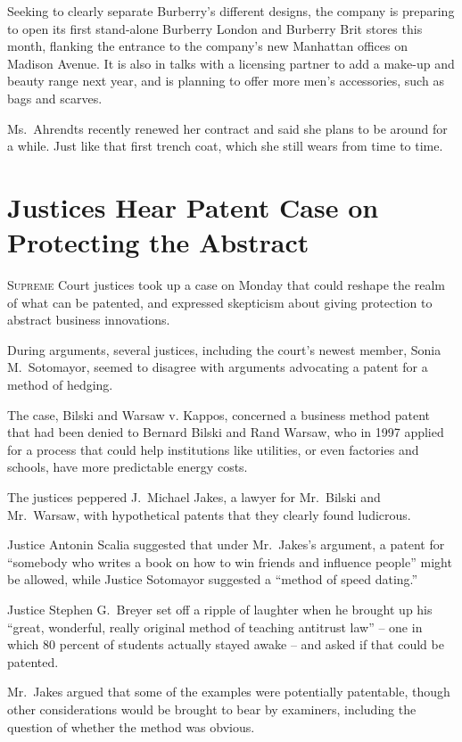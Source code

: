 ﻿\documentclass[12pt]{article}
\begin{document}
Seeking to clearly separate Burberry's different designs, the company is preparing to open its first
stand-alone Burberry London and Burberry Brit stores this month, flanking the entrance to the
company's new Manhattan offices on Madison Avenue. It is also in talks with a licensing partner to
add a make-up and beauty range next year, and is planning to offer more men's accessories, such as
bags and scarves.

Ms.~Ahrendts recently renewed her contract and said she plans to be around for a while. Just like
that first trench coat, which she still wears from time to time.

\section{Justices Hear Patent Case on Protecting the Abstract}

\lettrine{S}{upreme} Court justices took up a case on Monday that could
reshape the realm of what can be patented, and expressed skepticism about giving protection to
abstract business innovations.

During arguments, several justices, including the court's newest member, Sonia M.~Sotomayor, seemed
to disagree with arguments advocating a patent for a method of hedging.

The case, Bilski and Warsaw v. Kappos, concerned a business method patent that had been denied to
Bernard Bilski and Rand Warsaw, who in 1997 applied for a process that could help institutions like
utilities, or even factories and schools, have more predictable energy costs.

The justices peppered J.~Michael Jakes, a lawyer for Mr.~Bilski and Mr.~Warsaw, with hypothetical
patents that they clearly found ludicrous.

Justice Antonin Scalia suggested that under Mr.~Jakes's argument, a patent for ``somebody who writes
a book on how to win friends and influence people'' might be allowed, while Justice Sotomayor
suggested a ``method of speed dating.''

Justice Stephen G.~Breyer set off a ripple of laughter when he brought up his ``great, wonderful,
really original method of teaching antitrust law'' -- one in which 80 percent of students actually
stayed awake -- and asked if that could be patented.

Mr.~Jakes argued that some of the examples were potentially patentable, though other considerations
would be brought to bear by examiners, including the question of whether the method was obvious.
\end{document}
